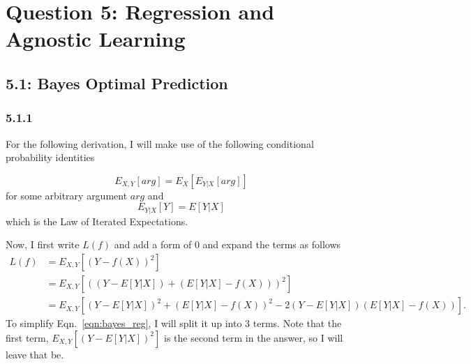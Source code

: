 \documentclass[12pt]{amsart}
\begin{document}

\section*{Question 5: Regression and Agnostic Learning}

\subsection*{5.1: Bayes Optimal Prediction}

\subsubsection*{5.1.1}

For the following derivation, I will make use of the following conditional probability identities

\begin{equation} \label{eqn:exp_rule_1}
E_{X,Y}[arg] = E_{X}[E_{Y|X}[arg]]
\end{equation}
for some arbitrary argument $arg$ and 
\begin{equation} \label{eqn:exp_rule_2}
E_{Y|X}[Y] = E[Y|X]
\end{equation}
which is the Law of Iterated Expectations.

Now, I first write $L(f)$ and add a form of 0 and expand the terms as follows
\begin{equation} \label{eqn:bayes_reg}
\begin{split}
L(f) & = E_{X,Y}[(Y - f(X))^2] \\
& = E_{X,Y}[((Y - E[Y|X]) + (E[Y|X] - f(X)))^2] \\
& = E_{X,Y}[(Y - E[Y|X])^2 + (E[Y|X] - f(X))^2 - 2(Y - E[Y|X])(E[Y|X] - f(X))] .
\end{split}
\end{equation}
To simplify Eqn.~\ref{eqn:bayes_reg}, I will split it up into 3 terms.  Note that the first term, $E_{X,Y}[(Y - E[Y|X])^2]$ is the second term in the answer, so I will leave that be.  
\end{document}
